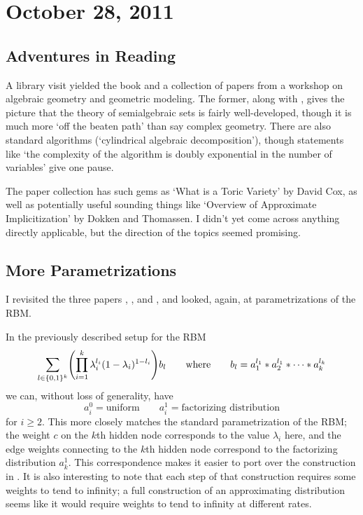 \documentclass[11pt]{article}
\begin{document}
\section{October 28, 2011}

\subsection{Adventures in Reading}

A library visit yielded the book \cite{BCR98} and a collection of papers
\cite{Top02} from a workshop on algebraic geometry and geometric modeling.  The
former, along with \cite{Cos09}, gives the picture that the theory of
semialgebraic sets is fairly well-developed, though it is much more `off the
beaten path' than say complex geometry.  There are also standard algorithms
(`cylindrical algebraic decomposition'), though statements like `the complexity
of the algorithm is doubly exponential in the number of variables' give one
pause.

The paper collection has such gems as `What is a Toric Variety' by David Cox, as
well as potentially useful sounding things like `Overview of Approximate
Implicitization' by Dokken and Thomassen.  I didn't yet come across anything
directly applicable, but the direction of the topics seemed promising.

\subsection{More Parametrizations}

I revisited the three papers \cite{CMS09}, \cite{Mon10}, and \cite{MA10}, and
looked, again, at parametrizations of the RBM.

In the previously described setup for the RBM
\[
    \sum_{l \in \{0,1\}^k} \pdil*{\prod_{i=1}^k \lambda_i^{l_i} (1 -
    \lambda_i)^{1 - l_i}} b_l
    \qquad\text{where}\qquad
    b_l = a_1^{l_1} * a_2^{l_1} * \cdots * a_k^{l_k}
\]
we can, without loss of generality, have
\[
    a_i^0 = \text{uniform}
    \qquad
    a_i^1 = \text{factorizing distribution}
\]
for $i \ge 2$.  This more closely matches the standard parametrization of the
RBM; the weight $c$ on the $k$th hidden node corresponds to the value
$\lambda_i$ here, and the edge weights connecting to the $k$th hidden node
correspond to the factorizing distribution $a_k^1$.  This correspondence makes
it easier to port over the construction in \cite{MA10}.  It is also interesting
to note that each step of that construction requires some weights to tend to
infinity; a full construction of an approximating distribution seems like it
would require weights to tend to infinity at different rates.
\end{document}

